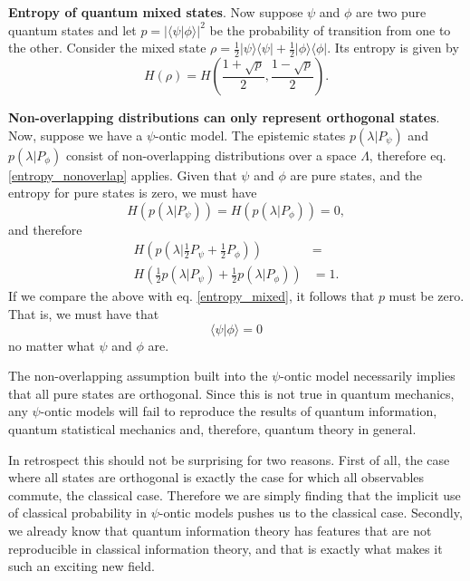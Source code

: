 \documentclass[10pt,twocolumn, nofootinbib]{revtex4-2}
\begin{document}
\textbf{Entropy of quantum mixed states}. Now suppose $\psi$ and $\phi$ are two pure quantum states and let $p = | \langle \psi | \phi \rangle |^2$ be the probability of transition from one to the other. Consider the mixed state $\rho = \frac{1}{2} | \psi \rangle \langle \psi | + \frac{1}{2} | \phi \rangle \langle \phi |$. Its entropy is given by
\begin{equation}\label{entropy_mixed}
	H(\rho) = H\left(\frac{1+\sqrt{p}}{2}, \frac{1-\sqrt{p}}{2}\right).
\end{equation}

\textbf{Non-overlapping distributions can only represent orthogonal states}. Now, suppose we have a $\psi$-ontic model. The epistemic states $p(\lambda|P_\psi)$ and $p(\lambda|P_\phi)$ consist of non-overlapping distributions over a space $\Lambda$, therefore eq. \ref{entropy_nonoverlap} applies. Given that $\psi$ and $\phi$ are pure states, and the entropy for pure states is zero, we must have
\begin{equation}\label{entropy_pure}
	H(p(\lambda|P_\psi)) = H(p(\lambda|P_\phi)) = 0,
\end{equation}
and therefore
\begin{equation}\label{required_entropy}
	\begin{aligned}
	H\left(p(\lambda|\frac{1}{2}P_\psi + \frac{1}{2}P_\phi)\right) &= \\
H\left(\frac{1}{2}p(\lambda|P_\psi) + \frac{1}{2}p(\lambda|P_\phi)\right) 
&= 1.
	\end{aligned}
\end{equation}
If we compare the above with eq. \ref{entropy_mixed}, it follows that $p$ must be zero. That is, we must have that
\begin{equation}\label{orthogonal}
	 \langle \psi | \phi \rangle = 0
\end{equation}
no matter what $\psi$ and $\phi$ are.

The non-overlapping assumption built into the $\psi$-ontic model necessarily implies that all pure states are orthogonal. Since this is not true in quantum mechanics, any $\psi$-ontic models will fail to reproduce the results of quantum information, quantum statistical mechanics and, therefore, quantum theory in general.

In retrospect this should not be surprising for two reasons. First of all, the case where all states are orthogonal is exactly the case for which all observables commute, the classical case. Therefore we are simply finding that the implicit use of classical probability in $\psi$-ontic models pushes us to the classical case. Secondly, we already know that quantum information theory has features that are not reproducible in classical information theory, and that is exactly what makes it such an exciting new field.
\end{document}
